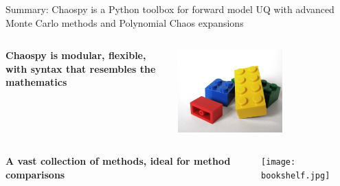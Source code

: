 \documentclass[handout]{beamer}
\begin{document}
\begin{frame}{Summary: Chaospy is a Python toolbox for forward model UQ with advanced Monte Carlo methods and Polynomial Chaos expansions}
\vspace{-5mm}
\begin{columns}

     \begin{center}
      \bf{Chaospy is modular, flexible, with syntax that resembles the mathematics}
     \end{center}
     \begin{center}
            \includegraphics[width=0.6\textwidth]{lego.jpg}
     \end{center}

 \end{columns}

\vspace{10mm}

\begin{columns}
  \begin{center}
   \bf{A vast collection of methods, ideal for method comparisons}
  \end{center}
     \begin{center}
            \texttt{[image: bookshelf.jpg]}
     \end{center}

 \end{columns}




\end{frame}
\end{document}
